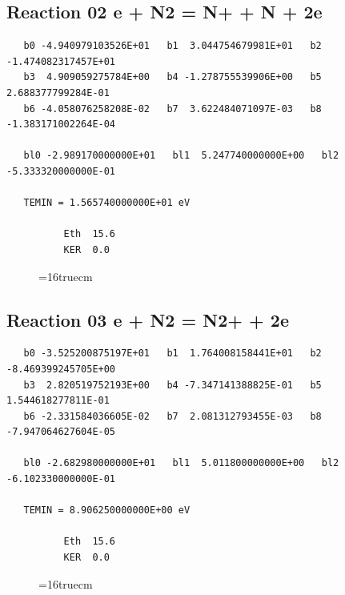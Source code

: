 \documentclass[12pt,dvipdfm]{article}
\begin{document}
\subsection{
Reaction 02 e + N2 = N+ + N + 2e }
\begin{small}\begin{verbatim}
   b0 -4.940979103526E+01   b1  3.044754679981E+01   b2 -1.474082317457E+01
   b3  4.909059275784E+00   b4 -1.278755539906E+00   b5  2.688377799284E-01
   b6 -4.058076258208E-02   b7  3.622484071097E-03   b8 -1.383171002264E-04

   bl0 -2.989170000000E+01   bl1  5.247740000000E+00   bl2 -5.333320000000E-01

   TEMIN = 1.565740000000E+01 eV

          Eth  15.6
          KER  0.0
\end{verbatim}\end{small}
\begin{figure}[h!] \label{n2rates}
\epsfxsize=16truecm
\end{figure}
\newpage

\subsection{
Reaction 03 e + N2 = N2+ + 2e }
\begin{small}\begin{verbatim}
   b0 -3.525200875197E+01   b1  1.764008158441E+01   b2 -8.469399245705E+00
   b3  2.820519752193E+00   b4 -7.347141388825E-01   b5  1.544618277811E-01
   b6 -2.331584036605E-02   b7  2.081312793455E-03   b8 -7.947064627604E-05

   bl0 -2.682980000000E+01   bl1  5.011800000000E+00   bl2 -6.102330000000E-01

   TEMIN = 8.906250000000E+00 eV

          Eth  15.6
          KER  0.0
\end{verbatim}\end{small}
\begin{figure}[h!] \label{n2rates}
\epsfxsize=16truecm
\end{figure}
\newpage
\end{document}
